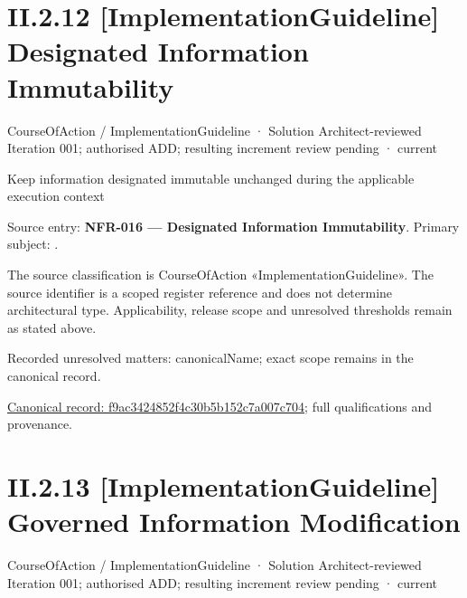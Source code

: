 \section*{II.2.12 [ImplementationGuideline] Designated Information Immutability}
\label{navigation:II.2.12}

\label{element:f9ac3424852f4c30b5b152c7a007c704}
{\small CourseOfAction / ImplementationGuideline · Solution Architect-reviewed Iteration 001; authorised ADD; resulting increment review pending · current}\par

Keep information designated immutable unchanged during the applicable execution context



Source entry: \textbf{NFR-016 — Designated Information Immutability}. Primary subject: \texttt{}.



The source classification is CourseOfAction «ImplementationGuideline». The source identifier is a scoped register reference and does not determine architectural type. Applicability, release scope and unresolved thresholds remain as stated above.


{\small Recorded unresolved matters: canonicalName; exact scope remains in the canonical record.}\par
{\footnotesize \href{../../../../continuum/strategy/course-of-action/implementation-guideline/f9ac3424852f4c30b5b152c7a007c704.md}{Canonical record: f9ac3424852f4c30b5b152c7a007c704}; full qualifications and provenance.}\par
\section*{II.2.13 [ImplementationGuideline] Governed Information Modification}
\label{navigation:II.2.13}

\label{element:d08bf41d719c43e3bc1a54bd79d95741}
{\small CourseOfAction / ImplementationGuideline · Solution Architect-reviewed Iteration 001; authorised ADD; resulting increment review pending · current}\par

